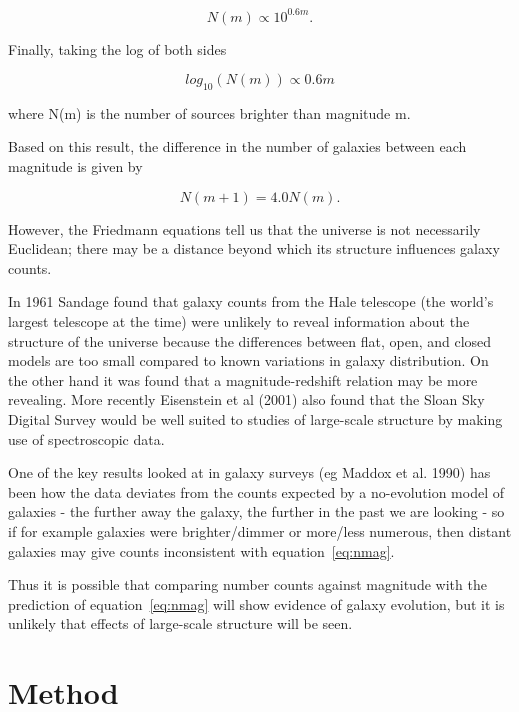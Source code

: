 \documentclass[a4paper,11pt,twoside]{article}
\begin{document}
\begin{equation}
N(m) \propto 10^{0.6m}.
\end{equation}

Finally, taking the log of both sides

\begin{equation}
\label{eq:nmag}
log_{10}(N(m)) \propto 0.6m
\end{equation}

where N(m) is the number of sources brighter than magnitude m.

Based on this result, the difference in the number of galaxies between
each magnitude is given by

\begin{equation}
N(m+1) = 4.0N(m).
\end{equation}

However, the Friedmann equations tell us that the 
universe is not necessarily Euclidean; there may be a distance 
beyond which its structure influences galaxy counts.

In 1961 Sandage \cite{sandage} found that galaxy counts from the Hale telescope 
(the world's largest telescope at the time\cite{hale}) were unlikely to 
reveal information about the structure of the universe because 
the differences between flat, open, and closed models are too small compared 
to known variations in galaxy distribution. On the other hand it was found 
that a magnitude-redshift relation may be more revealing. 
More recently Eisenstein et al (2001)\cite{eisen} also found that the Sloan 
Sky Digital Survey would be well suited to studies of large-scale structure 
by making use of spectroscopic data.

One of the key results looked at in galaxy surveys 
(eg Maddox et al. 1990)\cite{maddox} has been how the data deviates from 
the counts expected by a no-evolution model of galaxies - the further 
away the galaxy, the further in the past we are looking - so if for 
example galaxies were brighter/dimmer or more/less numerous, then 
distant galaxies may give counts inconsistent with equation~\ref{eq:nmag}.

Thus it is  possible that comparing number counts against magnitude 
with the prediction of equation~\ref{eq:nmag} will show evidence of 
galaxy evolution, but it is unlikely that effects of large-scale
structure will be seen.

\section{Method}
\end{document}
